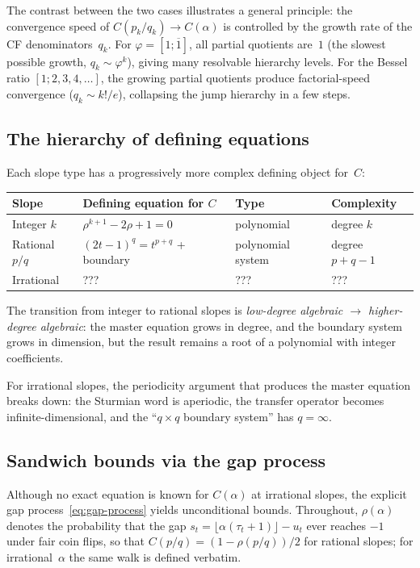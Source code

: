 \documentclass[11pt]{article}
\theoremstyle{definition}
\theoremstyle{remark}
\newcommand{\floor}[1]{\lfloor #1 \rfloor}
\begin{document}
The contrast between the two cases illustrates a general principle:
the convergence speed of $C(p_k/q_k) \to C(\alpha)$ is controlled
by the growth rate of the CF denominators~$q_k$.
For $\varphi = [1; \overline{1}]$, all partial quotients are~$1$
(the slowest possible growth, $q_k \sim \varphi^k$), giving many
resolvable hierarchy levels.
For the Bessel ratio $[1; 2, 3, 4, \ldots]$, the growing partial
quotients produce factorial-speed convergence ($q_k \sim k!/e$),
collapsing the jump hierarchy in a few steps.

\subsection{The hierarchy of defining equations}

Each slope type has a progressively more complex defining object
for~$C$:

\begin{center}
\begin{tabular}{llll}
\toprule
Slope & Defining equation for $C$ & Type & Complexity \\
\midrule
Integer $k$ & $\rho^{k+1} - 2\rho + 1 = 0$ & polynomial &
  degree $k$ \\
Rational $p/q$ & $(2t-1)^q = t^{p+q}$ + boundary &
  polynomial system & degree $p+q-1$ \\
Irrational & ??? & ??? & ??? \\
\bottomrule
\end{tabular}
\end{center}

The transition from integer to rational slopes is
\emph{low-degree algebraic $\to$ higher-degree algebraic}: the
master equation grows in degree, and the boundary system grows in
dimension, but the result remains a root of a polynomial with
integer coefficients.

For irrational slopes, the periodicity argument that produces the
master equation breaks down: the Sturmian word is aperiodic, the
transfer operator becomes infinite-dimensional, and the
``$q \times q$ boundary system'' has $q = \infty$.

\subsection{Sandwich bounds via the gap process}

Although no exact equation is known for $C(\alpha)$ at irrational
slopes, the explicit gap process~\eqref{eq:gap-process} yields
unconditional bounds.
Throughout, $\rho(\alpha)$ denotes the probability that the gap
$s_t = \floor{\alpha(\tau_t + 1)} - u_t$ ever reaches $-1$ under
fair coin flips, so that $C(p/q) = (1 - \rho(p/q))/2$ for rational
slopes; for irrational~$\alpha$ the same walk is defined verbatim.
\end{document}
